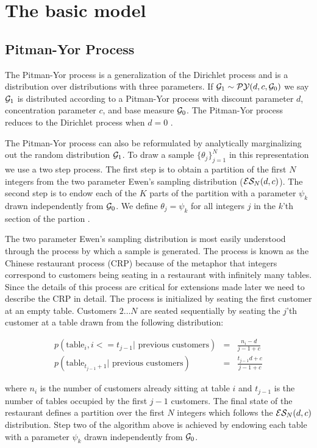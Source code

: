 
\section{The basic model}

\subsection{Pitman-Yor Process}

The Pitman-Yor process is a generalization of the Dirichlet process and is a distribution over distributions with three parameters.  If $\G_1 \sim \PY(d,c,\G_0)$ we say $\G_1$ is distributed according to a Pitman-Yor process with discount parameter $d$, concentration parameter $c$, and base measure $\G_0$. The Pitman-Yor process reduces to the Dirichlet process when $d = 0$ \cite{Pitman}. 

The Pitman-Yor process can also be reformulated by analytically marginalizing out the random distribution $\G_1$.  To draw a sample $\{ \theta_j \}_{j = 1}^N$ in this representation we use a two step process.  The first step is to obtain a partition of the first $N$ integers from the two parameter Ewen's sampling distribution ($\ES_N(d,c)$).  The second step is to endow each of the $K$ parts of the partition with a parameter $\psi_k$ drawn independently from $\G_0$.  We define $\theta_j = \psi_k$ for all integers $j$ in the $k$'th section of the partion \cite{mcqueen??}.

The two parameter Ewen's sampling distribution is most easily understood through the process by which a sample is generated.  The process is known as the Chinese restaurant process (CRP) because of the metaphor that integers correspond to customers being seating in a restaurant with infinitely many tables.  Since the details of this process are critical for extensions made later we need to describe the CRP in detail. The process is initialized by seating the first customer at an empty table.  Customers $2 \dots N$ are seated sequentially by seating the $j$'th customer at a table drawn from the following distribution:

\begin{eqnarray*}
p(\textrm{table}_i, i<= t_{j-1} |\textrm{ previous customers}) &=& \frac{n_i - d}{j-1+ c}\\
p(\textrm{table}_{t_{j-1} +1} | \textrm{ previous customers}) &=& \frac{t_{j-1}d +c}{j-1+c}
\end{eqnarray*}

where $n_i$ is the number of customers already sitting at table $i$ and $t_{j-1}$ is the number of tables occupied by the first $j-1$ customers.  The final state of the restaurant defines a partition over the first $N$ integers which follows the $\ES_N(d,c)$ distribution.  Step two of the algorithm above is achieved by endowing each table with a parameter $\psi_k$ drawn independently from $\G_0$.

